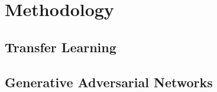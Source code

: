 \section{Methodology}

\subsection{Transfer Learning}

\lipsum[0]

\subsection{Generative Adversarial Networks}

\lipsum[1]
